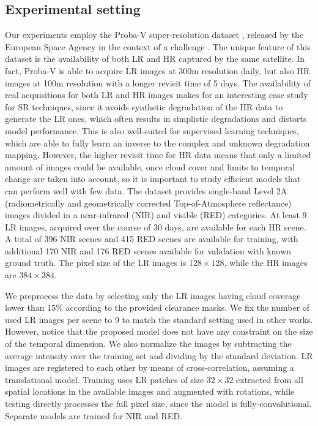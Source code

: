 \documentclass[journal]{IEEEtran}
\begin{document}
\subsection{Experimental setting}
Our experiments employ the Proba-V super-resolution dataset \cite{martens2019super}, released by the European Space Agency in the context of a challenge \cite{web:kelvins}. The unique feature of this dataset is the availability of both LR and HR captured by the same satellite. In fact, Proba-V is able to acquire LR images at 300m resolution daily, but also HR images at 100m resolution with a longer revisit time of 5 days. The availability of real acquisitions for both LR and HR images makes for an interesting case study for SR techniques, since it avoids synthetic degradation of the HR data to generate the LR ones, which often results in simplistic degradations and distorts model performance. This is also well-suited for supervised learning techniques, which are able to fully learn an inverse to the complex and unknown degradation mapping. However, the higher revisit time for HR data means that only a limited amount of images could be available, once cloud cover and limits to temporal change are taken into account, so it is important to study efficient models that can perform well with few data. 
The dataset provides single-band Level 2A (radiometrically and geometrically corrected Top-of-Atmosphere  reflectance) images divided in a near-infrared (NIR) and visible (RED) categories. At least 9 LR images, acquired over the course of 30 days, are available for each HR scene. A total of 396 NIR scenes and 415 RED scenes are available for training, with additional 170 NIR and 176 RED scenes available for validation with known ground truth. The pixel size of the LR images is $128\times 128$, while the HR images are $384 \times 384$.

We preprocess the data by selecting only the LR images having cloud coverage lower than $15\%$ according to the provided clearance masks. We fix the number of used LR images per scene to 9 to match the standard setting used in other works. However, notice that the proposed model does not have any constraint on the size of the temporal dimension.  We also normalize the images by subtracting the average intensity over the training set and dividing by the standard deviation. LR images are registered to each other by means of cross-correlation, assuming a translational model. 
Training uses LR patches of size $32 \times 32$ extracted from all spatial locations in the available images and augmented with rotations, while testing directly processes the full pixel size, since the model is fully-convolutional. Separate models are trained for NIR and RED.
\end{document}
